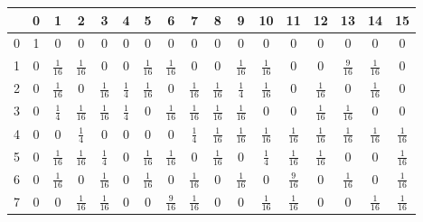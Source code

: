 \begin{refsegment}
\begin{table}
\begin{center}
\begin{tabular}{|c|cccccccccccccccc|} \hline
  &0& 1            & 2            & 3            & 4            & 5            & 6            & 7
     & 8            & 9            &10            &11            &12            &13            &14            &15            \\
\hline
 0&1& 0            & 0            & 0            & 0            & 0            & 0            & 0
     & 0            & 0            & 0            & 0            & 0            & 0            & 0            & 0            \\
 1&0&$\frac{1}{16}$&$\frac{1}{16}$& 0            & 0            &$\frac{1}{16}$&$\frac{1}{16}$& 0
     & 0            &$\frac{1}{16}$&$\frac{1}{16}$& 0            & 0            &$\frac{9}{16}$&$\frac{1}{16}$& 0            \\
 2&0&$\frac{1}{16}$& 0            &$\frac{1}{16}$&$\frac{1}{4}$ &$\frac{1}{16}$& 0            &$\frac{1}{16}$&$\frac{1}{16}$
     &$\frac{1}{4}$ &$\frac{1}{16}$& 0            &$\frac{1}{16}$& 0            &$\frac{1}{16}$& 0            \\
 3&0&$\frac{1}{4}$ &$\frac{1}{16}$&$\frac{1}{16}$&$\frac{1}{4}$ & 0            &$\frac{1}{16}$&$\frac{1}{16}$&$\frac{1}{16}$
     &$\frac{1}{16}$& 0            & 0            &$\frac{1}{16}$&$\frac{1}{16}$& 0            & 0            \\
 4&0& 0            &$\frac{1}{4}$ & 0            & 0            & 0            & 0            &$\frac{1}{4}$ &$\frac{1}{16}$
     &$\frac{1}{16}$&$\frac{1}{16}$&$\frac{1}{16}$&$\frac{1}{16}$&$\frac{1}{16}$&$\frac{1}{16}$&$\frac{1}{16}$\\
 5&0&$\frac{1}{16}$&$\frac{1}{16}$&$\frac{1}{4}$ & 0            &$\frac{1}{16}$&$\frac{1}{16}$& 0            &$\frac{1}{16}$
     & 0            &$\frac{1}{4}$ &$\frac{1}{16}$&$\frac{1}{16}$& 0            & 0            &$\frac{1}{16}$\\
 6&0&$\frac{1}{16}$& 0            &$\frac{1}{16}$& 0            &$\frac{1}{16}$& 0            &$\frac{1}{16}$& 0
     &$\frac{1}{16}$& 0            &$\frac{9}{16}$& 0            &$\frac{1}{16}$& 0            &$\frac{1}{16}$\\
 7&0& 0            &$\frac{1}{16}$&$\frac{1}{16}$& 0            & 0            &$\frac{9}{16}$&$\frac{1}{16}$& 0
     & 0            &$\frac{1}{16}$&$\frac{1}{16}$& 0            & 0            &$\frac{1}{16}$&$\frac{1}{16}$\\

\end{tabular}
\end{center}
\end{table}
\end{refsegment}
